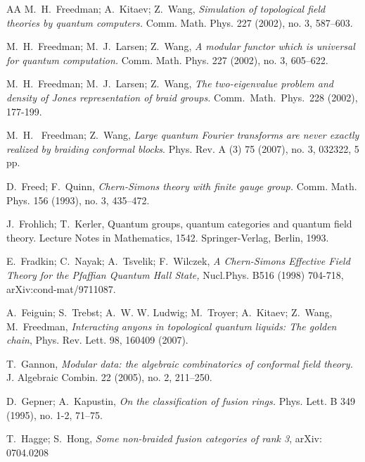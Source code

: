 \documentclass[12pt,psamsfonts]{amsart}
\numberwithin{equation}{section}
\theoremstyle{definition}
\begin{document}
\begin{thebibliography}{AA}
M.\ H.\ Freedman; A.\ Kitaev; Z.\ Wang,
\emph{Simulation of topological field theories by quantum
computers.} Comm. Math. Phys. 227 (2002), no. 3, 587--603.

 M.\ H.\ Freedman; M.\ J.\ Larsen; Z.\ Wang,
    \emph{A modular functor which is universal for quantum computation.} Comm. Math. Phys. 227 (2002), no. 3, 605--622.

 M.\ H.\ Freedman; M.\ J.\ Larsen; Z.\ Wang,
    \emph{The two-eigenvalue problem and density of Jones representation of braid groups.}
    Comm.\ Math.\ Phys.\ {228} (2002), 177-199.

M.\  H. \ Freedman; Z.\ Wang, \emph{Large quantum Fourier transforms are never exactly realized by braiding conformal blocks}.
 Phys. Rev. A (3) 75 (2007), no. 3, 032322, 5 pp.


D.\ Freed; F.\ Quinn, \emph{Chern-Simons theory with finite gauge group.}
 Comm. Math. Phys. 156 (1993), no. 3, 435--472.

 J.\ Frohlich; T.\ Kerler,
 Quantum groups, quantum categories and quantum field theory. Lecture Notes in Mathematics, 1542. Springer-Verlag, Berlin, 1993.

 E.\ Fradkin; C.\ Nayak; A.\ Tsvelik; F.\
 Wilczek, \emph{A Chern-Simons Effective Field Theory for the Pfaffian Quantum Hall
 State,} Nucl.Phys. B516 (1998) 704-718, arXiv:cond-mat/9711087.

 A.\ Feiguin; S.\ Trebst; A.\ W. W. Ludwig; M.\ Troyer; A.\ Kitaev; Z.\ Wang, M.\
 Freedman, \emph{Interacting anyons in topological quantum liquids: The golden
 chain}, Phys. Rev. Lett. 98, 160409 (2007).

 T.\ Gannon, \emph{Modular data: the algebraic combinatorics of conformal field theory.}
  J. Algebraic Combin. 22 (2005), no. 2, 211--250.

 D.\ Gepner; A.\ Kapustin, \emph{On the classification of fusion rings.}
  Phys. Lett. B 349 (1995), no. 1-2, 71--75.



T.\ Hagge; S.\ Hong, \emph{Some non-braided fusion categories of rank
3}, arXiv: 0704.0208


\end{thebibliography}
\end{document}
